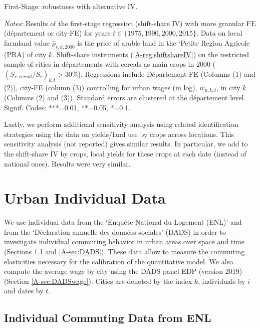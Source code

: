 \documentclass[11pt]{report}
\newcommand{\datatables}{../output/data/tables}
\begin{document}
\begin{table}[hp!]
	\begin{center}
		
		\caption{First-Stage: robustness with alternative IV.\label{A-tab:1SLSshiftshare}}
	\end{center}
	{\footnotesize \textit{Notes}: Results of the first-stage regression (shift-share IV) with more granular FE (département or city-FE) for years $t \in \{1975, 1990, 2000, 2015\}$. Data on local farmland value $\bar{\rho}_{r,k,2000}$ is the price of arable land in the `Petite Region Agricole (PRA) of city $k$.  Shift-share instruments (\ref{A-reg:shiftshareIV}) on the restricted sample of cities in départements with cereals as main crops in 2000 ($(S_{r,cereal}/S_r)_{k,t}>30\%$). Regressions include Département FE (Columns (1) and (2)), city-FE (column (3))  controlling for urban wages (in log), $w_{u,k,t}$, in city $k$ (Columns (2) and (3)). Standard errors are clustered at the département level. Signif. Codes: ***=0.01, **=0.05, *=0.1.}
\end{table}

Lastly, we perform additional sensitivity analysis using related identification strategies using the data on yields/land use by crops across locations. This sensitivity analysis (not reported) gives similar results. In particular, we add to the shift-share IV by crops, local yields for these crops at each date (instead of national ones). Results were very similar. 

\pagebreak
\section{Urban Individual Data}\label{A-sec:urbanindividual}

We use individual data from the `Enquête National du Logement (ENL)' and from the `Déclaration annuelle des données sociales' (DADS) in order to investigate individual commuting behavior in urban areas over space and time (Sections \ref{A-sec:commuting} and \ref{A-sec:DADS}). These data allow to measure the commuting elasticities necessary for the calibration of the quantitative model. We also compute the average wage by city using the DADS panel EDP (version 2019) (Section \ref{A-sec:DADSwage}). Cities are denoted by the index $k$, individuals by $i$ and dates by $t$.

\subsection{Individual Commuting Data from ENL}\label{A-sec:commuting}
\end{document}
